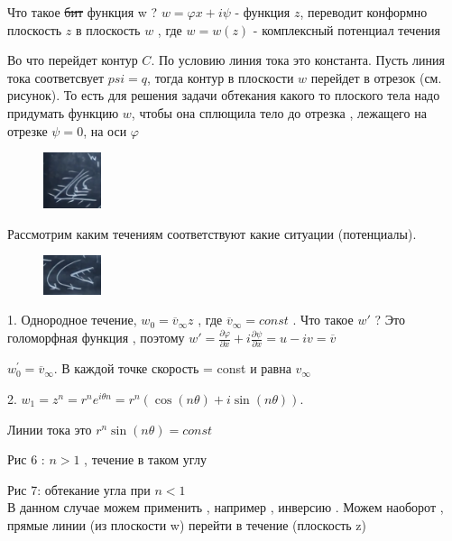 Что такое \sout{бит}  функция w ? $w = \varphi x + i \psi$ - функция $z$, переводит конформно плоскость $z$ в плоскость $w$ , где $w=w(z)$ - комплексный потенциал течения

Во что перейдет контур $C$. По условию линия тока это константа. Пусть линия тока соответсвует $psi = q$, тогда контур в плоскости $w$ перейдет в отрезок (см. рисунок). То есть для решения задачи обтекания какого то плоского тела надо придумать функцию $w$, чтобы она сплющила тело до отрезка , лежащего на отрезке $\psi = 0$, на оси $\varphi$
$$$$
\newpage 

\begin{figure}
	\includegraphics[width=0.15\textwidth]{14/pic_6.png}
	\caption{\label{ris:image14.6}}
\end{figure}



Рассмотрим каким течениям соответствуют какие  ситуации (потенциалы).

\begin{figure}
	\includegraphics[width=0.15\textwidth]{14/pic_7.png}
	\caption{\label{ris:image14.7}}
\end{figure}

1. Однородное течение, $w_0 = \overline{v}_{\infty} z$  , где $ \overline{v}_{\infty}  = const$ . Что такое $w'$ ? Это голоморфная функция , поэтому $w' = \frac{\partial \varphi}{\partial x} + i \frac{\partial \psi}{\partial x}  = u - iv = \overline{v}$


$w_0^{'} = \overline{v}_{\infty}$. В каждой точке скорость = const и равна $v_{\infty}$

2. $w_1 = z^n = r^n e^{i \theta n} = r^n(\cos(n \theta) + i \sin (n \theta) )$.  

Линии тока это $r^n \sin(n \theta) = const $ 

Рис 6 : $n > 1$ , течение в таком углу 

Рис 7: обтекание угла при $n < 1$ \\

В данном случае можем применить , например , инверсию . Можем наоборот , прямые линии (из плоскости w) перейти в течение (плоскость z)

